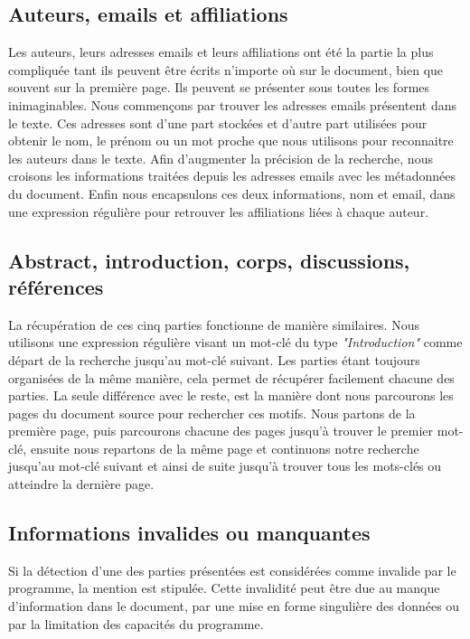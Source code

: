 \documentclass[12pt, final]{article}
\begin{document}
        \subsection{\fontsubsection Auteurs, emails et affiliations}
        Les auteurs, leurs adresses emails et leurs affiliations ont été la partie la plus compliquée tant ils peuvent être écrits n'importe où sur le document, bien que souvent sur la première page. Ils peuvent se présenter sous toutes les formes inimaginables.\newline
        Nous commençons par trouver les adresses emails présentent dans le texte.  Ces adresses sont d'une part stockées et d'autre part utilisées pour obtenir le nom, le prénom ou un mot proche que nous utilisons pour reconnaitre les auteurs dans le texte. Afin d'augmenter la précision de la recherche, nous croisons les informations traitées depuis les adresses emails avec les métadonnées du document.\newline
        Enfin nous encapsulons ces deux informations, nom et email, dans une expression régulière pour retrouver les affiliations liées à chaque auteur.
        
        \subsection{\fontsubsection Abstract, introduction, corps, discussions, références}
        La récupération de ces cinq parties fonctionne de manière similaires. Nous utilisons une expression régulière visant un mot-clé du type \textit{"Introduction"} comme départ de la recherche jusqu'au mot-clé suivant. Les parties étant toujours organisées de la même manière, cela permet de récupérer facilement chacune des parties.\newline
        La seule différence avec le reste, est la manière dont nous parcourons les pages du document source pour rechercher ces motifs. Nous partons de la première page, puis parcourons chacune des pages jusqu'à trouver le premier mot-clé, ensuite nous repartons de la même page et continuons notre recherche jusqu'au mot-clé suivant et ainsi de suite jusqu'à trouver tous les mots-clés ou atteindre la dernière page.
        
        \subsection{\fontsubsection Informations invalides ou manquantes}
        Si la détection d'une des parties présentées est considérées comme invalide par le programme, la mention  est stipulée. Cette invalidité peut être due au manque d'information dans le document, par une mise en forme singulière des données ou par la limitation des capacités du programme.
    
\end{document}
